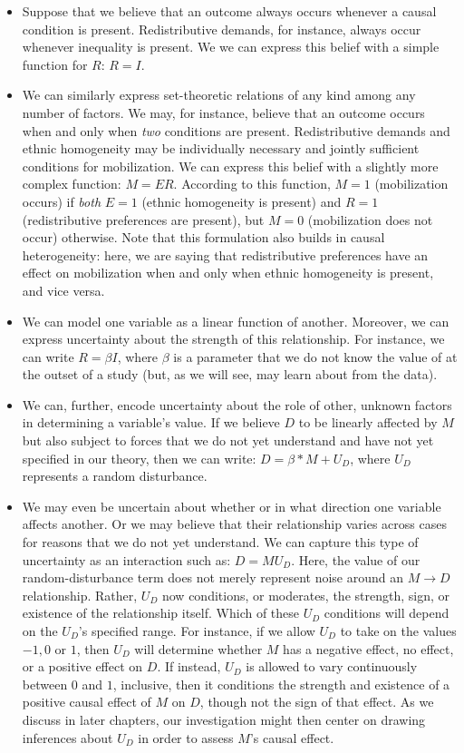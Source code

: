 \documentclass[12pt,]{book}
\begin{document}
\begin{itemize}
\item
  Suppose that we believe that an outcome always occurs whenever a causal condition is present. Redistributive demands, for instance, always occur whenever inequality is present. We we can express this belief with a simple function for \(R\): \(R=I\).
\item
  We can similarly express set-theoretic relations of any kind among any number of factors. We may, for instance, believe that an outcome occurs when and only when \emph{two} conditions are present. Redistributive demands and ethnic homogeneity may be individually necessary and jointly sufficient conditions for mobilization. We can express this belief with a slightly more complex function: \(M=E R\). According to this function, \(M=1\) (mobilization occurs) if \emph{both} \(E=1\) (ethnic homogeneity is present) and \(R=1\) (redistributive preferences are present), but \(M=0\) (mobilization does not occur) otherwise. Note that this formulation also builds in causal heterogeneity: here, we are saying that redistributive preferences have an effect on mobilization when and only when ethnic homogeneity is present, and vice versa.
\item
  We can model one variable as a linear function of another. Moreover, we can express uncertainty about the strength of this relationship. For instance, we can write \(R=\beta I\), where \(\beta\) is a parameter that we do not know the value of at the outset of a study (but, as we will see, may learn about from the data).
\item
  We can, further, encode uncertainty about the role of other, unknown factors in determining a variable's value. If we believe \(D\) to be linearly affected by \(M\) but also subject to forces that we do not yet understand and have not yet specified in our theory, then we can write: \(D=\beta*M+U_D\), where \(U_D\) represents a random disturbance.
\item
  We may even be uncertain about whether or in what direction one variable affects another. Or we may believe that their relationship varies across cases for reasons that we do not yet understand. We can capture this type of uncertainty as an interaction such as: \(D=M U_D\). Here, the value of our random-disturbance term does not merely represent noise around an \(M \rightarrow D\) relationship. Rather, \(U_D\) now conditions, or moderates, the strength, sign, or existence of the relationship itself. Which of these \(U_D\) conditions will depend on the \(U_D\)'s specified range. For instance, if we allow \(U_D\) to take on the values \(-1, 0\) or \(1\), then \(U_D\) will determine whether \(M\) has a negative effect, no effect, or a positive effect on \(D\). If instead, \(U_D\) is allowed to vary continuously between \(0\) and \(1\), inclusive, then it conditions the strength and existence of a positive causal effect of \(M\) on \(D\), though not the sign of that effect. As we discuss in later chapters, our investigation might then center on drawing inferences about \(U_D\) in order to assess \(M\)'s causal effect.

\end{itemize}
\end{document}
